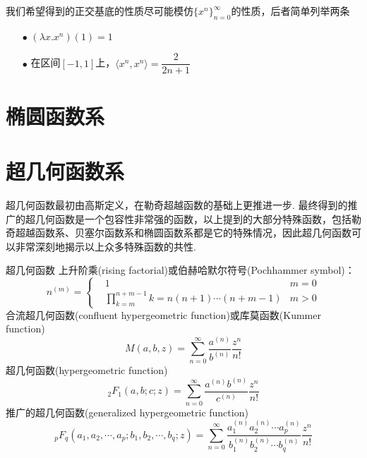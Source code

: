 \documentclass[main.tex]{subfiles}
\begin{document}
我们希望得到的正交基底的性质尽可能模仿\(\{x^n\}_{n=0}^{\infty}\)的性质，后者简单列举两条
\begin{itemize}
    \item [\(\bullet\)] \((\lambda x.x^n)(1) = 1\)
    \item [\(\bullet\)] 在区间\([-1,1]\)上，\(\langle x^n,x^n \rangle = \dfrac{2}{2n+1}\)
\end{itemize}

\section{椭圆函数系}

\section{超几何函数系}

超几何函数最初由高斯定义，在勒奇超越函数的基础上更推进一步. 最终得到的推广的超几何函数是一个包容性非常强的函数，以上提到的大部分特殊函数，包括勒奇超越函数系、贝塞尔函数系和椭圆函数系都是它的特殊情况，因此超几何函数可以非常深刻地揭示以上众多特殊函数的共性.

\begin{definition}{超几何函数}
    上升阶乘(rising factorial)或伯赫哈默尔符号(Pochhammer symbol)：
    \[n^{(m)} = \left\{\begin{aligned} &1 & m=0 \\ & \prod_{k=m}^{n+m-1}k = n(n+1)\cdots(n+m-1) & m > 0 \end{aligned}\right.\]
    合流超几何函数(confluent hypergeometric function)或库莫函数(Kummer function)
    \[M(a,b,z) = \sum_{n=0}^{\infty}\frac{a^{(n)}}{b^{(n)}}\frac{z^n}{n!}\]
    超几何函数(hypergeometric function)
    \[_2F_1(a,b;c;z) = \sum_{n=0}^{\infty}\frac{a^{(n)}b^{(n)}}{c^{(n)}}\frac{z^n}{n!}\]
    推广的超几何函数(generalized hypergeometric function)
    \[_pF_q(a_1, a_2, \cdots, a_p; b_1, b_2, \cdots, b_q;z) = \sum_{n=0}^{\infty}\frac{a_1^{(n)}a_2^{(n)}\cdots a_p^{(n)}}{b_1^{(n)}b_2^{(n)}\cdots b_q^{(n)}}\frac{z^n}{n!}\]
\end{definition}
\end{document}
